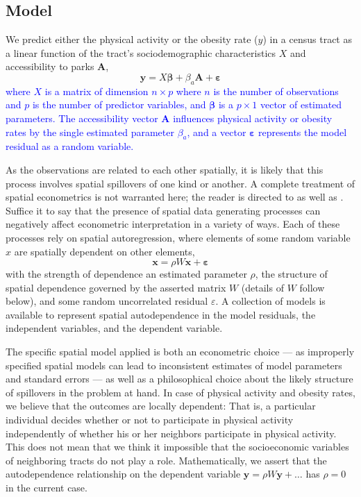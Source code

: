 \documentclass[shortAfour,sageh.bst]{sagej}
\begin{document}
\hypertarget{model}{%
\subsection{Model}\label{model}}

\label{subsec:model}

We predict either the physical activity or the obesity rate (\(y\)) in a
census tract as a linear function of the tract's sociodemographic
characteristics \(X\) and accessibility to parks \(\boldsymbol{A}\),
\begin{equation}\label{eq:themodel}
 \boldsymbol{y} = X\boldsymbol{\beta} + \beta_{a}\boldsymbol{A} + \boldsymbol{\varepsilon}
\end{equation}
\textcolor{blue}{where \(X\) is a matrix of dimension \(n\times p\) where
\(n\) is the number of observations and \(p\) is the number of predictor
variables, and \(\boldsymbol{\beta}\) is a \(p\times 1\) vector of
estimated parameters. The accessibility vector \(\boldsymbol{A}\)
influences physical activity or obesity rates by the single estimated
parameter \(\beta_a\), and a vector \(\boldsymbol{\varepsilon}\)
represents the model residual as a random variable.}

As the observations are related to each other spatially, it is likely
that this process involves spatial spillovers of one kind or another. A
complete treatment of spatial econometrics is not warranted here; the
reader is directed to \citet{LeSage2009} as well as \citet{LeSage2014}.
Suffice it to say that the presence of spatial data generating processes
can negatively affect econometric interpretation in a variety of ways.
Each of these processes rely on spatial autoregression, where elements
of some random variable \(x\) are spatially dependent on other elements,
\begin{equation}\label{eq:autoregression}
 \boldsymbol{x} = \rho W \boldsymbol{x} + \boldsymbol{\varepsilon}
\end{equation} with the strength of dependence an estimated parameter
\(\rho\), the structure of spatial dependence governed by the asserted
matrix \(W\) (details of \(W\) follow below), and some random
uncorrelated residual \(\varepsilon\). A collection of models is
available to represent spatial autodependence in the model residuals,
the independent variables, and the dependent variable.

The specific spatial model applied is both an econometric choice --- as
improperly specified spatial models can lead to inconsistent estimates
of model parameters and standard errors --- as well as a philosophical
choice about the likely structure of spillovers in the problem at hand.
In case of physical activity and obesity rates, we believe that the
outcomes are locally dependent: That is, a particular individual decides
whether or not to participate in physical activity independently of
whether his or her neighbors participate in physical activity. This does
not mean that we think it impossible that the socioeconomic variables of
neighboring tracts do not play a role. Mathematically, we assert that
the autodependence relationship on the dependent variable
\(\boldsymbol{y} = \rho W \boldsymbol{y} + \ldots\) has \(\rho = 0\) in
the current case.
\end{document}
